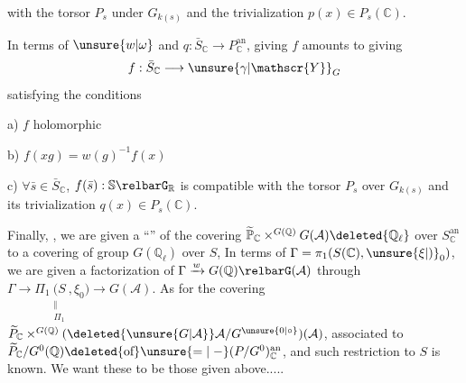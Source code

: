 with the torsor $P_s$ under $G_{k(s)}$ and the trivialization $p(x)\in P_s(\mathbb{C})$.

In terms of $\unsure{w|\omega}$ and $q:\bar S_{\mathbb{C}}\longrightarrow P_{\mathbb{C}}^{\mathrm{an}}$, giving $f$ amounts to giving
\[
f:\bar S_{\mathbb{C}}\longrightarrow\unsure{\gamma|\mathscr{Y}}_G
\]
satisfying the conditions

a) $f$ holomorphic

b) $f(xg)=w(g)^{-1}f(x)$

c)  $\forall\bar s\in\bar S_{\mathbb{C}}$,  $f(\bar s):\mathbb{S}\relbarG_{\mathbb{R}}$ is compatible with the torsor $P_s$ over $G_{k(s)}$ and its trivialization $q(x)\in P_s(\mathbb{C})$.

Finally, , we are given a ``'' of the covering $\widetilde{\mathbb P}_{\mathbb{C}}\mathbin{\times}^{G(\mathbb{Q})}G(\mathcal A)\deleted{\mathbb{Q}_{\ell}}$ over $S_{\mathbb{C}}^{\mathrm{an}}$ to a covering
 of group $G(\mathbb{Q}_{\ell})$ over $S$, In terms  of $\Gamma=\pi_1(S(\mathbb{C}),\unsure{\xi|\mathord{)}}_0)$, we are given a factorization of $\Gamma\xrightarrow{w}G(\mathbb{Q})\relbarG(\mathcal A)$ through $\Gamma\longrightarrow\Pi_1\underset{\substack{\Vert\\\Pi_1}}{(S},\xi_0)\longrightarrow G(\mathcal A)$. As for the covering $\widetilde P_{\mathbb{C}}\mathbin{\times}^{G(\mathbb{Q})}(\deleted{\unsure{G|\mathcal A}}\mathcal A/G^{\unsure{0|\circ}})(\mathcal A)$,  associated to $\widetilde P_{\mathbb{C}}/G^0(\mathbb{Q})\deleted{\text{of}}\unsure{=|\relbar}(P/G^0)_{\mathbb{C}}^{\mathrm{an}}$, and  such  restriction to $S$  is known. We want these to be those given above.....

